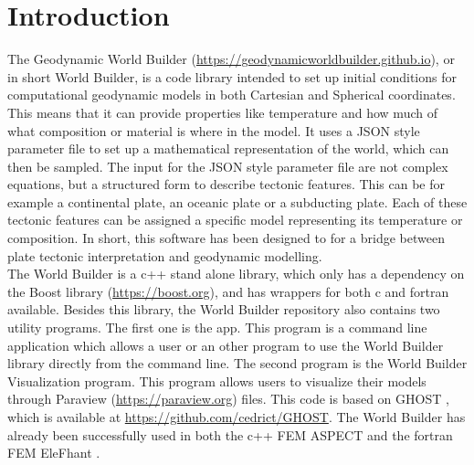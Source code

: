 \documentclass{book}
\newcommand{\GWB}{{Geodynamic World Builder}}
\newcommand{\WB}{{World Builder}}
\newcommand{\paraview}{{Paraview}}
\newcommand{\boost}{{Boost}}
\newcommand{\ghost}{{GHOST}}
\newcommand{\aspect}{{ASPECT}}
\newcommand{\elephant}{{EleFhant}}
\begin{document}
\chapter{Introduction}
The \GWB{} (\url{https://geodynamicworldbuilder.github.io}), or in short \WB{}, is a code library intended to set up initial conditions for computational geodynamic models in both Cartesian and Spherical coordinates. This means that it can provide properties like temperature and how much of what composition or material is where in the model. It uses a JSON style parameter file to set up a mathematical representation of the world, which can then be sampled. The input for the JSON style parameter file are not complex equations, but a structured form to describe tectonic features. This can be for example a continental plate, an oceanic plate or a subducting plate. Each of these tectonic features can be assigned a specific model representing its temperature or composition. In short, this software has been designed to for a bridge between plate tectonic interpretation and geodynamic modelling.
\\
The \WB{} is a c++ stand alone library, which only has a dependency on the \boost{} library (\url{https://boost.org}), and has wrappers for both c and fortran available. Besides this library, the \WB{} repository also contains two utility programs. The first one is the app. This program is a command line application which allows a user or an other program to use the \WB{} library directly from the command line. The second program is the \WB{} Visualization program. This program allows users to visualize their models through \paraview{} (\url{https://paraview.org}) files. This code is based on \ghost{} \cite{Thieulot_2018}, which is available at \url{https://github.com/cedrict/GHOST}. The \WB{} has already been successfully used in both the c++ FEM \aspect{} \cite{KHB12,heister_aspect_methods2,aspect-doi-v2.0.1,aspectmanual} and the fortran FEM \elephant{} \cite{Thieulot_2017}.
\end{document}
